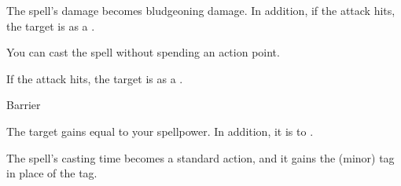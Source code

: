 
The spell's damage becomes bludgeoning damage.
In addition, if the attack hits, the target is  as a .






You can cast the spell without spending an action point.






If the attack hits, the target is  as a .





\newpage
\begin{spellsection}{Barrier}

\begin{spellheader}
\end{spellheader}

\begin{spellcontent}

\begin{spelltargetinginfo}



\end{spelltargetinginfo}


\begin{spelleffects}



\spelleffect
The target gains  equal to your spellpower.
In addition, it is  to .








\end{spelleffects}

\end{spellcontent}
\begin{spellfooter}


\end{spellfooter}
\begin{spellsubcontent}


\begin{spellcantrip}
The spell's casting time becomes a standard action, and it gains the  (minor) tag in place of the  tag.
\end{spellcantrip}


\end{spellsubcontent}
\end{spellsection}


